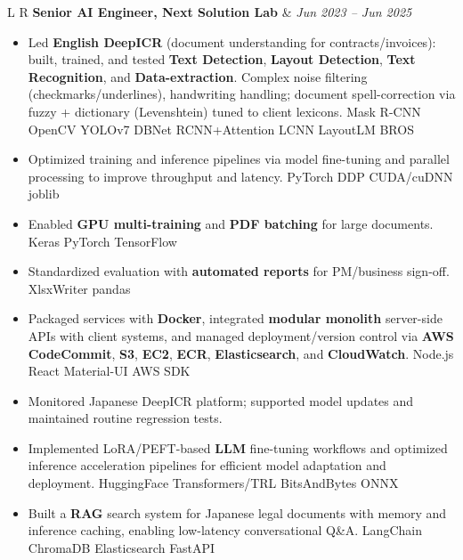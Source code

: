 \documentclass[10pt,letterpaper]{article}
\newcommand{\pill}[1]{%
  \begingroup\setlength{\fboxsep}{1.2pt}%
  \colorbox{brandblue!12}{\textcolor{brandblue}{\scriptsize #1}}%
  \endgroup
}
\begin{document}
\vspace{5pt}
\begin{tabularx}{\linewidth}{L R}
\fontsize{12}{10}\selectfont\textbf{Senior AI Engineer, Next Solution Lab} & \textit{Jun 2023 -- Jun 2025} \\
\end{tabularx}
\begin{itemize}
  \item Led \textbf{English DeepICR} (document understanding for contracts/invoices): built, trained, and tested \textbf{Text Detection}, \textbf{Layout Detection}, \textbf{Text Recognition}, and \textbf{Data-extraction}. Complex noise filtering (checkmarks/underlines), handwriting handling; document spell-correction via fuzzy + dictionary (Levenshtein) tuned to client lexicons.
  \pill{Mask R-CNN} \pill{OpenCV} \pill{YOLOv7} \pill{DBNet} \pill{RCNN+Attention} \pill{LCNN} \pill{LayoutLM} \pill{BROS}
  \item Optimized training and inference pipelines via model fine-tuning and parallel processing to improve throughput and latency. \pill{PyTorch DDP} \pill{CUDA/cuDNN} \pill{joblib}
  \item Enabled \textbf{GPU multi-training} and \textbf{PDF batching} for large documents. \pill{Keras} \pill{PyTorch} \pill{TensorFlow}
  \item Standardized evaluation with \textbf{automated reports} for PM/business sign-off. \pill{XlsxWriter} \pill{pandas}
  \item Packaged services with \textbf{Docker}, integrated \textbf{modular monolith} server-side APIs with client systems, and managed deployment/version control via \textbf{AWS CodeCommit}, \textbf{S3}, \textbf{EC2}, \textbf{ECR}, \textbf{Elasticsearch}, and \textbf{CloudWatch}.
  \pill{Node.js} \pill{React} \pill{Material-UI} \pill{AWS SDK}
  \item Monitored Japanese DeepICR platform; supported model updates and maintained routine regression tests.
  \item Implemented LoRA/PEFT-based \textbf{LLM} fine-tuning workflows and optimized inference acceleration pipelines for efficient model adaptation and deployment. \pill{HuggingFace Transformers/TRL} \pill{BitsAndBytes} \pill{ONNX}
  \item Built a \textbf{RAG} search system for Japanese legal documents with memory and inference caching, enabling low-latency conversational Q\&A. \pill{LangChain} \pill{ChromaDB} \pill{Elasticsearch} \pill{FastAPI}
\end{itemize}
\end{document}
